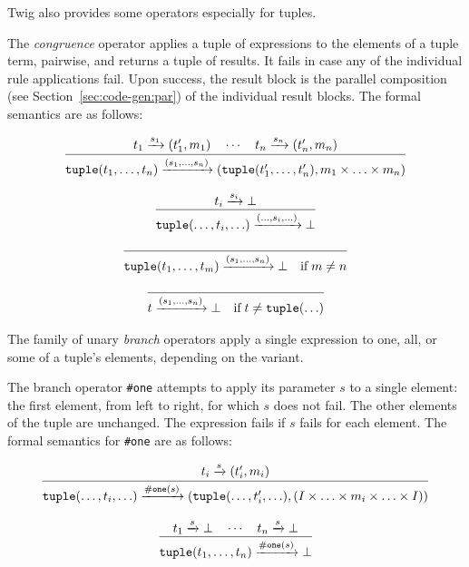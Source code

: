 Twig also provides some operators especially for tuples.

The \emph{congruence} operator applies a tuple of expressions to
the elements of a tuple term, pairwise, and returns a tuple of
results. It fails in case any of the individual rule applications
fail. Upon success, the result block is the parallel composition
(see Section~\ref{sec:code-gen:par}) of the individual result
blocks. The formal semantics are as follows:

\begin{equation}
\label{T1}
\infer
  {\mathtt{tuple}(t_1,\ldots,t_n) \arr{(s_1,\ldots,s_n)} (\mathtt{tuple}(t_1',\ldots,t_n'),m_1 \times \ldots \times m_n)}
  {t_1 \arr{s_1} (t_1',m_1) \quad \cdots \quad t_n \arr{s_n} (t_n',m_n)}
\end{equation}

\begin{equation}
\label{T2}
\infer
  {\mathtt{tuple}(\ldots,t_i,\ldots)\arr{(\ldots,s_i,\ldots)}\bot}
  {t_i \arr{s_i} \bot}
\end{equation}

\begin{equation}
\label{T3}
\infer
  {\mathtt{tuple}(t_1,\ldots,t_m) \arr{(s_1,\ldots,s_n)} \bot 
   \quad\mbox{if}\; m \neq n}
  {}
\end{equation}

\begin{equation}
\label{T4}
\infer
  {t \arr{(s_1,\ldots,s_n)} \bot
  \quad\mbox{if}\; t \neq \mathtt{tuple}(\ldots)}
  {}  
\end{equation}


The family of unary \emph{branch} operators apply a single
expression to one, all, or some of a tuple's elements, depending
on the variant.

The branch operator \texttt{\#one} attempts to apply its parameter
$s$ to a single element: the first element, from left to right,
for which $s$ does not fail. The other elements of the tuple are
unchanged. The expression fails if $s$ fails for each element. The
formal semantics for \texttt{\#one} are as follows:

\begin{equation}
\infer
  {\mathtt{tuple}(\ldots,t_i,\ldots) \arr{\mathtt{\#one}(s)} (\mathtt{tuple}(\ldots,t_i',\ldots),(I \times \ldots \times m_i \times \ldots \times I))}
  {t_i \arr{s} (t_i',m_i)}
\end{equation}

\begin{equation}
\infer
  {\mathtt{tuple}(t_1,\ldots,t_n) \arr{\mathtt{\#one}(s)} \bot}
  {t_1 \arr{s} \bot \quad \cdots \quad t_n \arr{s} \bot}  
\end{equation}

